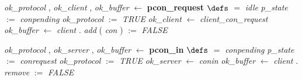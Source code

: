 %
\vspace{-4.5ex}\bsetindent
\begin{tabbing}
\bSetTabs
\+\>
%
%
{\em ok\_protocol\/} , {\em ok\_client\/} , {\em ok\_buffer\/} $\longleftarrow$  {\bf { pcon\_request}}  \bhsp $\defs$ \+ \bnl
   $=$ {\em idle\/} \- \bhsp {} \+\bnl
{\em p\_state\/} $:=$  {\em conpending\/} \bparallel \bnl
{\em ok\_protocol\/} $:=$  {\em TRUE\/} \bparallel \bnl
{\em ok\_client\/} $\longleftarrow$ {\em client\_con\_request\/}\label{client_con_request}  \bparallel \bnl
{\em ok\_buffer\/} $\longleftarrow$ {\em client\/} . {\em add\/}\label{add}  ( {\em con\/} )  \-\bnl
{}  $:=$  {\em FALSE\/} \-\bnl
{}  \- \bOperationSemiColon 
\end{tabbing}
\bresetindent
%
%
\vspace{-4.5ex}\bsetindent
\begin{tabbing}
\bSetTabs
\+\>
%
%
{\em ok\_protocol\/} , {\em ok\_server\/} , {\em ok\_buffer\/} $\longleftarrow$  {\bf { pcon\_in}}  \bhsp $\defs$ \+ \bnl
   $=$ {\em conpending\/} \- \bhsp {} \+\bnl
{\em p\_state\/} $:=$  {\em conrequest\/} \bparallel \bnl
{\em ok\_protocol\/} $:=$  {\em TRUE\/} \bparallel \bnl
{\em ok\_server\/} $\longleftarrow$ {\em conin\/}\label{conin}  \bparallel \bnl
{\em ok\_buffer\/} $\longleftarrow$ {\em client\/} . {\em remove\/}\label{remove}  \-\bnl
{}  $:=$  {\em FALSE\/} \-\bnl
{}  \- \bOperationSemiColon 
\end{tabbing}
\bresetindent
%
%
\vspace{-4.5ex}\bsetindent
